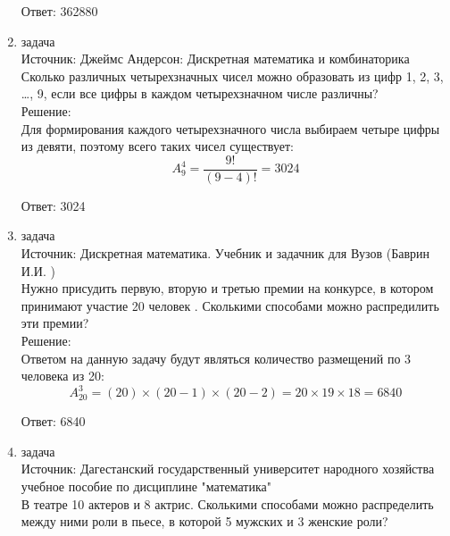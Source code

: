 \documentclass[a4paper,14pt]{extreport} %
\begin{document}
\begin{center}
\begin{enumerate}
						Ответ: 362880
						
						
						
						
						
						
						
						
						
						 \item {\large задача  }\\
						Источник: Джеймс Андерсон: Дискретная математика и комбинаторика\\
						\vspace{15pt}
						Сколько различных четырехзначных чисел можно образовать из
						цифр 1, 2, 3, \ldots, 9, если все цифры в каждом четырехзначном числе различны?\\
						\vspace{15pt}
						Решение:\\
						Для формирования каждого четырехзначного числа выбираем четыре цифры из
						девяти, поэтому всего таких чисел существует:
						\begin{equation}
							A_{9}^4 = \frac{9!}{(9-4)!} = 3024 
						\end{equation}
						
						Ответ: 3024
							
						\item {\large задача  }\\
						Источник: Дискретная математика. Учебник и задачник для Вузов (Баврин И.И. )\\
						\vspace{15pt}
						Нужно присудить первую, вторую и третью премии на конкурсе, в котором принимают  участие 20 человек . Сколькими способами можно распредилить эти премии?\\
						\vspace{15pt}
						Решение:\\
						Ответом на данную задачу будут являться количество размещений по 3 человека из 20:
						\begin{equation}
							A_{20}^3 = (20)\times(20-1)\times(20-2) = 20\times 19 \times 18 = 6840
						\end{equation}
						
						Ответ: 6840
						
						
						 
						 \item {\large задача }\\
						 Источник: Дагестанский государственный университет народного хозяйства учебное пособие по дисциплине "математика"  \\
						\vspace{15pt}
						 В театре 10 актеров и 8 актрис. Сколькими способами можно
						 распределить между ними роли в пьесе, в которой 5 мужских и 3
						 женские роли?\\
						 \vspace{15pt}
					

\end{enumerate}
\end{center}
\end{document}

